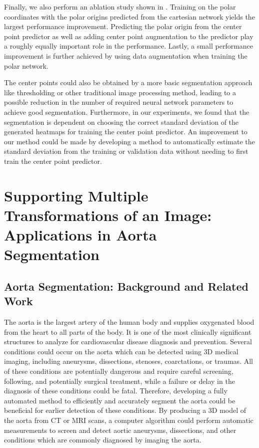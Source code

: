 Finally, we also perform an ablation study shown in . Training on the polar coordinates with the polar origins predicted from the cartesian network yields the largest performance improvement. Predicting the polar origin from the center point predictor as well as adding center point augmentation to the predictor play a roughly equally important role in the performance. Lastly, a small performance improvement is further achieved by using data augmentation when training the polar network.

The center points could also be obtained by a more basic segmentation approach 
like thresholding or other traditional image processing method, leading to a possible reduction in the 
number of required neural network parameters to achieve good segmentation. Furthermore, in our experiments,
we found that the segmentation is dependent on choosing the correct standard deviation of the generated 
heatmaps for training the center point predictor. An improvement to our method could be made by developing
a method to automatically estimate the standard deviation from the training or validation data without needing
to first train the center point predictor.

\section{Supporting Multiple Transformations of an Image: Applications in Aorta Segmentation}


\subsection{Aorta Segmentation: Background and Related Work}

The aorta is the largest artery of the human body and supplies oxygenated blood from the heart to all parts of the body. It is one of the most clinically significant structures to analyze for cardiovascular disease diagnosis and prevention. Several conditions could occur on the aorta which can be detected using 3D medical imaging, including aneurysms, dissections, stenoses, coarctations, or traumas. All of these conditions are potentially dangerous and require careful screening, following, and potentially surgical treatment, while a failure or delay in the diagnosis of these conditions could be fatal. Therefore, developing a fully automated method to efficiently and accurately segment the aorta could be beneficial for earlier detection of these conditions. By producing a 3D model of the aorta from CT or MRI scans, a computer algorithm could perform automatic measurements to screen and detect aortic aneurysms, dissections, and other conditions which are commonly diagnosed by imaging the aorta.

